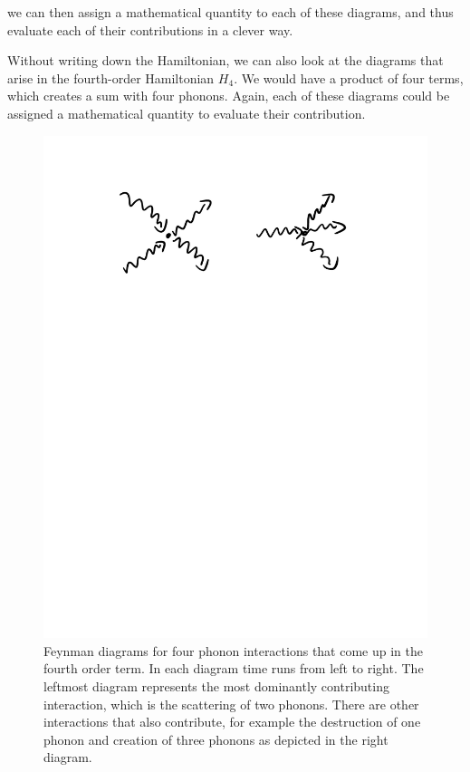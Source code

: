 we can then assign a mathematical quantity to each of these diagrams, and thus evaluate each of their contributions in a clever way.

Without writing down the Hamiltonian, we can also look at the diagrams that arise in the fourth-order Hamiltonian $H_4$. We would have a product of four terms, which creates a sum with four phonons. Again, each of these diagrams could be assigned a mathematical quantity to evaluate their contribution.

\begin{figure}[htbp]
    \centering
    \includegraphics[scale=0.7]{Images/fig-fourphonondiagrams.pdf}
    
    \caption{Feynman diagrams for four phonon interactions that come up in the fourth order term. In each diagram time runs from left to right. The leftmost diagram represents the most dominantly contributing interaction, which is the scattering of two phonons. There are other interactions that also contribute, for example the destruction of one phonon and creation of three phonons as depicted in the right diagram.}
    \label{fig-fourphonondiagrams}
\end{figure}

